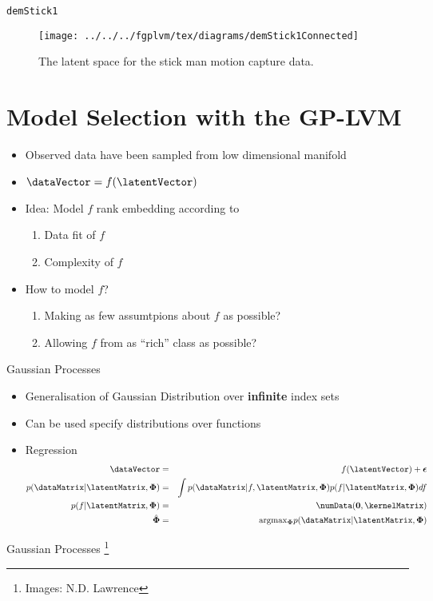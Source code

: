 \texttt{demStick1}

%
\begin{figure}
\centering{}\texttt{[image: ../../../fgplvm/tex/diagrams/demStick1Connected]}\caption{The latent space for the stick man motion capture data. }

\end{figure}



\section{Model Selection with the GP-LVM}
\begin{itemize}
\item Observed data have been sampled from low dimensional manifold 
\item $\dataVector=f(\latentVector)$ 
\item Idea: Model $f$ rank embedding according to 

\begin{enumerate}
\item Data fit of $f$ 
\item Complexity of $f$ 
\end{enumerate}
\item How to model $f$? 

\begin{enumerate}
\item Making as few assumtpions about $f$ as possible? 
\item Allowing $f$ from as {}``rich'' class as possible? 
\end{enumerate}
\end{itemize}
Gaussian Processes
\begin{itemize}
\item Generalisation of Gaussian Distribution over \textbf{infinite} index
sets 
\item Can be used specify distributions over functions 
\item Regression \begin{eqnarray*}
\dataVector & = & f(\latentVector)+\boldsymbol{\epsilon}\\
p(\dataMatrix|\latentMatrix,\boldsymbol{\Phi}) & = & \int p(\dataMatrix|f,\latentMatrix,\boldsymbol{\Phi})p(f|\latentMatrix,\boldsymbol{\Phi})df\\
p(f|\latentMatrix,\boldsymbol{\Phi}) & = & \mathcal{\numData}(\mathbf{0},\kernelMatrix)\\
\hat{\boldsymbol{\Phi}} & = & \mathrm{argmax}{}_{\boldsymbol{\Phi}}p(\dataMatrix|\latentMatrix,\boldsymbol{\Phi})\end{eqnarray*}
 
\end{itemize}
Gaussian Processes%
\footnote{Images: N.D. Lawrence%
}

